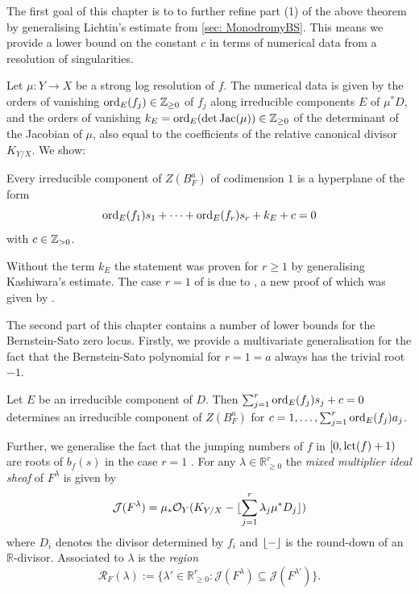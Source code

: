 The first goal of this chapter is to to further refine part (1) of the above theorem by generalising Lichtin's estimate from \cref{sec: MonodromyBS}.
This means we provide a lower bound on the constant $c$ in terms of numerical data from a resolution of singularities.

Let $\mu:Y\to X$ be a strong log resolution of $f$.
The numerical data is given by the orders of vanishing $\operatorname{ord}_{E}(f_j)\in\mathbb{Z}_{\geq 0}$ of $f_j$ along irreducible components $E$ of $\mu^*D$, and the orders of vanishing $k_E=\operatorname{ord}_{E}(\det \operatorname{Jac}(\mu))\in\mathbb{Z}_{\geq 0}$ of the determinant of the Jacobian of $\mu$, also equal to the coefficients of the relative canonical divisor $K_{Y/X}$. We show:
\begin{theorem}\label{thm: MainTheorem}
  Every irreducible component of $Z(B_F^a)$ of codimension $1$ is a hyperplane of the form
  $$\operatorname{ord}_{E}(f_1)s_1 + \cdots + \operatorname{ord}_{E}(f_r)s_r + k_E + c=0 $$
with $c\in\mathbb{Z}_{>0}$.
\end{theorem}

Without the term $k_E$ the statement was proven for $r\ge 1$ by \cite[Lemma 4.4.6]{budur2020zeroII} generalising Kashiwara's estimate.
The case $r=1$ of  is due to \cite{lichtin1989poles}, a new proof of which was given by \cite{DM}.

The second part of this chapter contains a number of lower bounds for the Bernstein-Sato zero locus.
Firstly, we provide a multivariate generalisation for the fact that the Bernstein-Sato polynomial for $r=1=a$ always has the trivial root $-1$.
\begin{proposition}
  Let $E$ be an irreducible component of $D$.
  Then $\sum_{j=1}^r \operatorname{ord}_{E}(f_j)s_j + c = 0$ determines an irreducible component of $Z(B_F^a)$ for $c = 1,\ldots, \sum_{j=1}^{r}\operatorname{ord}_{E}(f_j)a_j$.
\end{proposition}
Further, we generalise the fact that the jumping numbers of $f$ in $[0,\operatorname{lct}(f)+1)$ are roots of $b_{f}(s)$ in the case $r=1$ \cite[Theorem 2]{BSArbitraryVariety}.
For any $\lambda\in \mathbb{R}_{\geq 0}^r$ the {\it mixed multiplier ideal sheaf} of $F^\lambda$ is given by
$$\mathcal{J}(F^\lambda) = \mu_*\mathcal{O}_Y(K_{Y/X} - \lfloor \sum_{j=1}^r \lambda_j \mu^* D_j \rfloor)$$
where $D_i$ denotes the divisor determined by $f_i$ and $\lfloor {-} \rfloor$ is the round-down of an $\mathbb{R}$-divisor.
Associated to $\lambda$ is the {\it region} $$\mathcal{R}_F(\lambda):= \{\lambda'\in \mathbb{R}_{\geq 0}^r:\mathcal{J}(F^{\lambda}) \subseteq \mathcal{J}(F^{\lambda'})\}.$$

